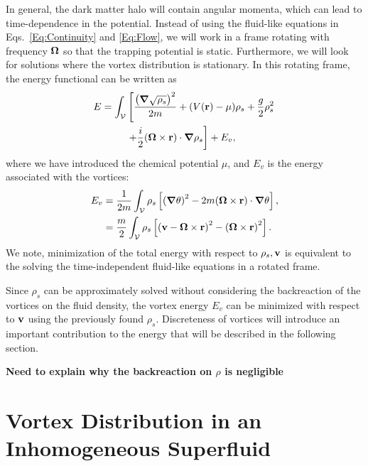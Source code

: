 \documentclass[aps,prd,twocolumn,nofootinbib,superscriptaddress]{revtex4-1}
\newcommand{\bfnab}{{\boldsymbol \nabla}}
\begin{document}
In general, the dark matter halo will contain angular momenta, which can lead to time-dependence in the potential.  Instead of using the fluid-like equations in Eqs.~\eqref{Eq:Continuity} and \eqref{Eq:Flow}, we will work in a frame rotating with frequency ${\bf \Omega}$ so that the trapping potential is static.  Furthermore, we will look for solutions where the vortex distribution is stationary.  In this rotating frame, the energy functional can be written as
\begin{align}
E = \int_\mathcal{V}&\left[\frac{\left(\bfnab \sqrt{\rho_s}\right)^2}{2m} + (V({\bf r})-\mu)\rho_s + \frac{g}{2}\rho_s^2\right.\nonumber\\
&\left. + \frac{i}{2}({\bf \Omega}\times {\bf r})\cdot\bfnab\rho_s\right] + E_v,
\end{align}
where we have introduced the chemical potential $\mu$, and $E_v$ is the energy associated with the vortices:
\begin{align}
E_v &= \frac{1}{2m}\int_\mathcal{V}\rho_s\left[\left(\bfnab \theta\right)^2 - 2m({\bf \Omega}\times {\bf r})\cdot \bfnab \theta \right],\nonumber\\
&= \frac{m}{2}\int_\mathcal{V}\rho_s\left[\left({\bf v} - {\bf \Omega}\times {\bf r}\right)^2 - \left({\bf \Omega}\times{\bf r}\right)^2\right].
\end{align}
We note, minimization of the total energy with respect to $\rho_s, {\bf v}$ is equivalent to the solving the time-independent fluid-like equations in a rotated frame.  

Since $\rho_s$ can be approximately solved without considering the backreaction of the vortices on the fluid density, the vortex energy $E_v$ can be minimized with respect to ${\bf v}$ using the previously found $\rho_s$. Discreteness of vortices will introduce an important contribution to the energy that will be described in the following section.

{\bf Need to explain why the backreaction on $\rho$ is negligible}

\section{Vortex Distribution in an Inhomogeneous Superfluid}
\label{Sec:Distribution}
\end{document}

